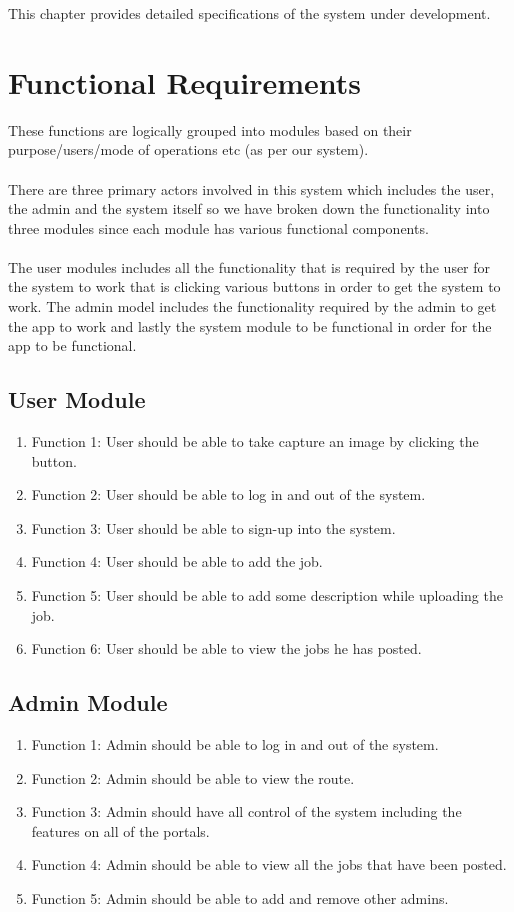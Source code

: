 This chapter provides detailed specifications of the system under development.

\section{Functional Requirements}
These functions are logically grouped into modules based on their purpose/users/mode of operations etc (as per our system). \\
\\
There are three primary actors involved in this system which includes the user, the admin and the system itself so we have broken down the functionality into three modules since each module has various functional components. \\
\\
The user modules includes all the functionality that is required by the user for the system to work that is clicking various buttons in order to get the system to work. The admin model includes the functionality required by the admin to get the app to work and lastly the system module to be functional in order for the app to be functional.  
  \subsection{User Module}
\begin{enumerate}
  \item Function 1: User should be able to take capture an image by clicking the button.
  \item Function 2: User should be able to log in and out of the system.
  \item Function 3: User should be able to sign-up into the system.
  \item Function 4: User should be able to add the job.
  \item Function 5: User should be able to add some description while uploading the job.
  \item Function 6: User should be able to view the jobs he has posted.
\end{enumerate}  
\subsection{Admin Module}
\begin{enumerate}
  \item Function 1: Admin should be able to log in and out of the system.
  \item Function 2: Admin should be able to view the route.
  \item Function 3: Admin should have all control of the system including the features on all of the portals.
  \item Function 4: Admin should be able to view all the jobs that have been posted.
  \item Function 5: Admin should be able to add and remove other admins.
\end{enumerate}
